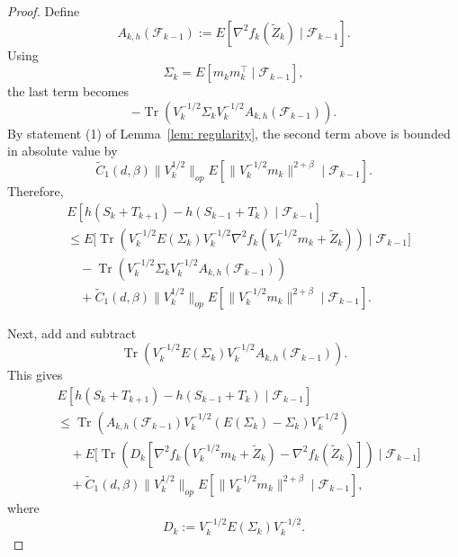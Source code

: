 \documentclass[10pt,a4paper]{article}
\begin{document}
\begin{proof}
Define
\[
    A_{k,h}(\mathcal F_{k-1})
    :=
    E\left[
    \nabla^2 f_k(\widetilde Z_k)
    \mid
    \mathcal F_{k-1}
    \right].
\]
Using
\[
    \Sigma_k=E[m_km_k^\top\mid\mathcal F_{k-1}],
\]
the last term becomes
\[
    -
    \operatorname{Tr}\left(
    V_k^{-1/2}\Sigma_k V_k^{-1/2}
    A_{k,h}(\mathcal F_{k-1})
    \right).
\]
By statement (1) of Lemma~\ref{lem: regularity}, the second term above is
bounded in absolute value by
\[
\tilde C_1(d,\beta)\|V_k^{1/2}\|_{op}
E\left[
\|V_k^{-1/2}m_k\|^{2+\beta}
\mid
\mathcal F_{k-1}
\right].
\]
Therefore,
\begin{align*}
& E\left[
h(S_k+T_{k+1})-h(S_{k-1}+T_k)
\mid
\mathcal F_{k-1}
\right]
\\
&\le
E\biggl[
\operatorname{Tr}\left(
V_k^{-1/2}E(\Sigma_k)V_k^{-1/2}
\nabla^2 f_k\left(V_k^{-1/2}m_k+\widetilde Z_k\right)
\right)
\mid
\mathcal F_{k-1}
\biggr]
\\
&\quad
-
\operatorname{Tr}\left(
V_k^{-1/2}\Sigma_k V_k^{-1/2}
A_{k,h}(\mathcal F_{k-1})
\right)
\\
&\quad
+
\tilde C_1(d,\beta)\|V_k^{1/2}\|_{op}
E\left[
\|V_k^{-1/2}m_k\|^{2+\beta}
\mid
\mathcal F_{k-1}
\right].
\end{align*}

Next, add and subtract
\[
\operatorname{Tr}\left(
V_k^{-1/2}E(\Sigma_k)V_k^{-1/2}
A_{k,h}(\mathcal F_{k-1})
\right).
\]
This gives
\begin{align*}
& E\left[
h(S_k+T_{k+1})-h(S_{k-1}+T_k)
\mid
\mathcal F_{k-1}
\right]
\\
&\le
\operatorname{Tr}\left(
A_{k,h}(\mathcal F_{k-1})
V_k^{-1/2}
\left(E(\Sigma_k)-\Sigma_k\right)
V_k^{-1/2}
\right)
\\
&\quad
+
E\biggl[
\operatorname{Tr}\left(
D_k
\left[
\nabla^2 f_k\left(V_k^{-1/2}m_k+\widetilde Z_k\right)
-
\nabla^2 f_k(\widetilde Z_k)
\right]
\right)
\mid
\mathcal F_{k-1}
\biggr]
\\
&\quad
+
\tilde C_1(d,\beta)\|V_k^{1/2}\|_{op}
E\left[
\|V_k^{-1/2}m_k\|^{2+\beta}
\mid
\mathcal F_{k-1}
\right],
\end{align*}
where
\[
    D_k:=V_k^{-1/2}E(\Sigma_k)V_k^{-1/2}.
\]


\end{proof}
\end{document}

